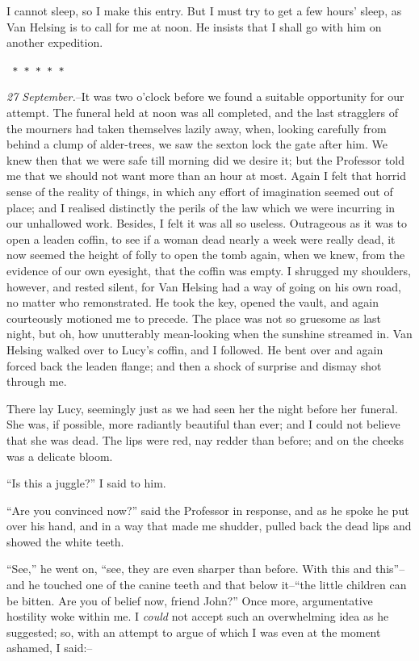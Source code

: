 \documentclass[12pt,openright]{book}
\begin{document}
I cannot sleep, so I make this entry. But I must try to get a few hours’ sleep, as Van Helsing is to call for me at noon. He insists that I shall go with him on another expedition.

\texttt{   *       *       *       *       *}

\textit{27 September.}–It was two o’clock before we found a suitable opportunity for our attempt. The funeral held at noon was all completed, and the last stragglers of the mourners had taken themselves lazily away, when, looking carefully from behind a clump of alder-trees, we saw the sexton lock the gate after him. We knew then that we were safe till morning did we desire it; but the Professor told me that we should not want more than an hour at most. Again I felt that horrid sense of the reality of things, in which any effort of imagination seemed out of place; and I realised distinctly the perils of the law which we were incurring in our unhallowed work. Besides, I felt it was all so useless. Outrageous as it was to open a leaden coffin, to see if a woman dead nearly a week were really dead, it now seemed the height of folly to open the tomb again, when we knew, from the evidence of our own eyesight, that the coffin was empty. I shrugged my shoulders, however, and rested silent, for Van Helsing had a way of going on his own road, no matter who remonstrated. He took the key, opened the vault, and again courteously motioned me to precede. The place was not so gruesome as last night, but oh, how unutterably mean-looking when the sunshine streamed in. Van Helsing walked over to Lucy’s coffin, and I followed. He bent over and again forced back the leaden flange; and then a shock of surprise and dismay shot through me.

There lay Lucy, seemingly just as we had seen her the night before her funeral. She was, if possible, more radiantly beautiful than ever; and I could not believe that she was dead. The lips were red, nay redder than before; and on the cheeks was a delicate bloom.

“Is this a juggle?” I said to him.

“Are you convinced now?” said the Professor in response, and as he spoke he put over his hand, and in a way that made me shudder, pulled back the dead lips and showed the white teeth.

“See,” he went on, “see, they are even sharper than before. With this and this”–and he touched one of the canine teeth and that below it–“the little children can be bitten. Are you of belief now, friend John?” Once more, argumentative hostility woke within me. I \textit{could} not accept such an overwhelming idea as he suggested; so, with an attempt to argue of which I was even at the moment ashamed, I said:–
\end{document}
